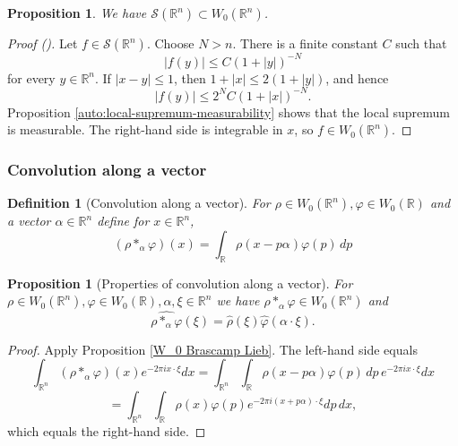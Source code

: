 \documentclass[12pt,reqno]{amsart}
\newcommand{\auto}{{({\tiny\faCar})}}
\theoremstyle{plain}
\newtheorem{proposition}[theorem]{Proposition}
\newtheorem{definition}[theorem]{Definition}
\numberwithin{equation}{section}
\theoremstyle{remark}
\newcommand{\uses}[1]{}
\newcommand{\usesdefs}[1]{}
\newcommand{\R}{{\mathbb R}}
\begin{document}
\begin{proposition}\label{P:schwartz-into-wiener}\uses{auto:local-supremum-measurability}\usesdefs{auto:Wiener-space-definition}
We have $\mathcal{S}(\R^n)\subset W_0(\R^n)$.
\end{proposition}

\begin{proof}[Proof \auto]
Let $f\in\mathcal S(\R^n)$. Choose $N>n$. There is a finite constant $C$ such that
\[
|f(y)|\le C(1+|y|)^{-N}
\]
for every $y\in\R^n$. If $|x-y|\le1$, then $1+|x|\le2(1+|y|)$, and hence
\[
|f(y)|\le 2^NC(1+|x|)^{-N}.
\]
Proposition \ref{auto:local-supremum-measurability} shows that the local supremum is measurable. The right-hand side is integrable in $x$, so $f\in W_0(\R^n)$.
\end{proof}


\subsubsection{Convolution along a vector}


\begin{definition}[Convolution along a vector]\label{auto:convolution-along-vector-definition}\uses{}\usesdefs{auto:Wiener-space-definition}
For $\rho\in W_0(\R^n), \varphi\in W_0(\R)$ and a vector $\alpha\in\mathbb{R}^n$ define for $x\in\mathbb{R}^n$,
\begin{equation}\label{auto:convolution-along-vector-formula} (\rho *_\alpha \varphi)(x) = \int_{\R} \rho(x-p\alpha) \varphi(p)\,dp \end{equation}
\end{definition}

\begin{proposition}[Properties of convolution along a vector]
\label{convolution vector}\uses{W_0 Brascamp Lieb}\usesdefs{auto:Wiener-space-definition,auto:convolution-along-vector-definition}
For $\rho \in W_0(\R^n), \varphi\in W_0(\R), \alpha,\xi\in\mathbb{R}^n$ we have $\rho *_\alpha \varphi\in W_0(\R^n)$ and
\begin{equation}\label{auto:convolution-along-vector-Fourier-transform} \widehat{\rho *_\alpha \varphi}(\xi) = \widehat{\rho}(\xi)\widehat{\varphi}(\alpha\cdot\xi). \end{equation}
\end{proposition}

\begin{proof}
Apply Proposition \ref{W_0 Brascamp Lieb}. The left-hand side equals
\[\int_{\R^n} (\rho *_\alpha \varphi)(x)e^{-2\pi ix\cdot \xi} dx=\int_{\R^n}  \int_{\R} \rho(x-p\alpha) \varphi(p)\,dp\,e^{-2\pi ix\cdot \xi} dx\]
\[=\int_{\R^n}  \int_{\R} \rho(x) \varphi(p) e^{-2\pi i (x+p\alpha)\cdot \xi} dp\,dx,\]
which equals the right-hand side.
\end{proof}
\end{document}
